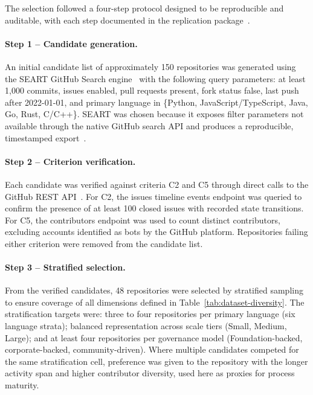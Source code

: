 The selection followed a four-step protocol designed to be reproducible
and auditable, with each step documented in the replication
package~\cite{oliveira2025replication}.

\paragraph{Step 1 – Candidate generation.}
An initial candidate list of approximately 150 repositories was
generated using the SEART GitHub Search engine~\cite{seart2021} with
the following query parameters: at least 1,000 commits, issues enabled,
pull requests present, fork status false, last push after 2022-01-01,
and primary language in \{Python, JavaScript/TypeScript, Java, Go, Rust,
C/C++\}. SEART was chosen because it exposes filter parameters not
available through the native GitHub search API and produces a
reproducible, timestamped export~\cite{dabic2021sampling}.

\paragraph{Step 2 – Criterion verification.}
Each candidate was verified against criteria C2 and C5 through direct
calls to the GitHub REST API~\cite{github2023api}. For C2, the issues
timeline events endpoint was queried to confirm the presence of at least
100 closed issues with recorded state transitions. For C5, the
contributors endpoint was used to count distinct contributors, excluding
accounts identified as bots by the GitHub platform. Repositories
failing either criterion were removed from the candidate list.

\paragraph{Step 3 – Stratified selection.}
From the verified candidates, 48 repositories were selected by
stratified sampling to ensure coverage of all dimensions defined in
Table~\ref{tab:dataset-diversity}. The stratification targets were:
three to four repositories per primary language (six language strata);
balanced representation across scale tiers (Small, Medium, Large); and
at least four repositories per governance model (Foundation-backed,
corporate-backed, community-driven). Where multiple candidates competed
for the same stratification cell, preference was given to the repository
with the longer activity span and higher contributor diversity, used
here as proxies for process maturity.

